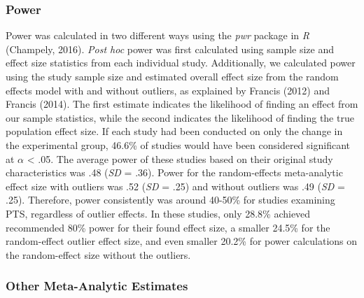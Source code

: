 \documentclass[man, mask]{apa6}
\theoremstyle{definition}
\theoremstyle{definition}
\theoremstyle{definition}
\theoremstyle{remark}
\begin{document}
\subsubsection{Power}\label{power}

Power was calculated in two different ways using the \emph{pwr} package
in \emph{R} (Champely, 2016). \emph{Post hoc} power was first calculated
using sample size and effect size statistics from each individual study.
Additionally, we calculated power using the study sample size and
estimated overall effect size from the random effects model with and
without outliers, as explained by Francis (2012) and Francis (2014). The
first estimate indicates the likelihood of finding an effect from our
sample statistics, while the second indicates the likelihood of finding
the true population effect size. If each study had been conducted on
only the change in the experimental group, 46.6\% of studies would have
been considered significant at \(\alpha\) \textless{} .05. The average
power of these studies based on their original study characteristics was
.48 (\emph{SD} = .36). Power for the random-effects meta-analytic effect
size with outliers was .52 (\emph{SD} = .25) and without outliers was
.49 (\emph{SD} = .25). Therefore, power consistently was around 40-50\%
for studies examining PTS, regardless of outlier effects. In these
studies, only 28.8\% achieved recommended 80\% power for their found
effect size, a smaller 24.5\% for the random-effect outlier effect size,
and even smaller 20.2\% for power calculations on the random-effect size
without the outliers.

\subsubsection{Other Meta-Analytic
Estimates}\label{other-meta-analytic-estimates}
\end{document}

